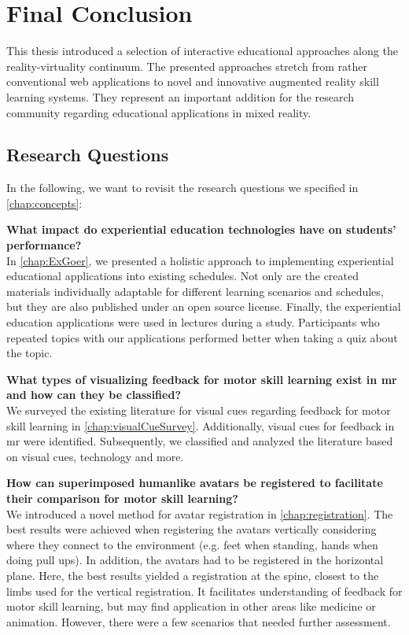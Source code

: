 %
\chapter{Final Conclusion}
\label{chap:conclusion}

This thesis introduced a selection of interactive educational approaches along the reality-virtuality continuum.
The presented approaches stretch from rather conventional web applications to novel and innovative augmented reality skill learning systems.
They represent an important addition for the research community regarding educational applications in mixed reality.

\section{Research Questions \label{sec:questions}}
In the following, we want to revisit the research questions we specified in \autoref{chap:concepts}:

\textbf{What impact do experiential education technologies have on students' performance?}\\
In \autoref{chap:ExGoer}, we presented a holistic approach to implementing experiential educational applications into existing schedules.
Not only are the created materials individually adaptable for different learning scenarios and schedules, but they are also published under an open source license.
Finally, the experiential education applications were used in lectures during a study.
Participants who repeated topics with our applications performed better when taking a quiz about the topic.

\textbf{What types of visualizing feedback for motor skill learning exist in \acrlong{mr} and how can they be classified?}\\
We surveyed the existing literature for visual cues regarding feedback for motor skill learning in \autoref{chap:visualCueSurvey}.
Additionally, visual cues for feedback in \acrshort{mr} were identified.
Subsequently, we classified and analyzed the literature based on visual cues, technology and more.

\textbf{How can superimposed humanlike avatars be registered to facilitate their comparison for motor skill learning?}\\
We introduced a novel method for avatar registration in \autoref{chap:registration}.
The best results were achieved when registering the avatars vertically considering where they connect to the environment (e.g. feet when standing, hands when doing pull ups).
In addition, the avatars had to be registered in the horizontal plane.
Here, the best results yielded a registration at the spine, closest to the limbs used for the vertical registration.
It facilitates understanding of feedback for motor skill learning, but may find application in other areas like medicine or animation.
However, there were a few scenarios that needed further assessment.

